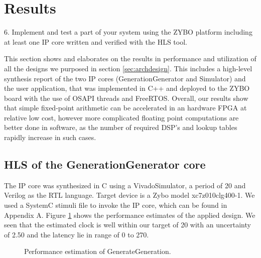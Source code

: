 \section{Results}\label{sec:results}
\begin{framed}
6. Implement and test a part of your system using the ZYBO platform including at least one IP core written and verified with the HLS tool.
\end{framed}

This section shows and elaborates on the results in performance and utilization of all the designs we purposed in section \ref{sec:archdesign}. This includes a high-level synthesis report of the two IP cores (GenerationGenerator and Simulator) and the user application, that was implemented in C++ and deployed to the ZYBO board with the use of OSAPI threads and FreeRTOS. Overall, our results show that simple fixed-point arithmetic can be accelerated in an hardware FPGA at relative low cost, however more complicated floating point computations are better done in software, as the number of required DSP's and lookup tables rapidly increase in such cases.

\subsection{HLS of the GenerationGenerator core}

The IP core was synthesized in C using a VivadoSimulator, a period of 20 and Verilog as the RTL language. Target device is a Zybo model xc7z010clg400-1. We used a SystemC stimuli file to invoke the IP core, which can be found in Appendix A. Figure \ref{fig:ggperformanceestimates} shows the performance estimates of the applied design. We seen that the estimated clock is well within our target of 20 with an uncertainty of 2.50 and the latency lie in range of 0 to 270.

\begin{figure}[h!]
	\centering
	\caption{Performance estimation of GenerateGeneration.}
	\label{fig:ggperformanceestimates}
\end{figure}

